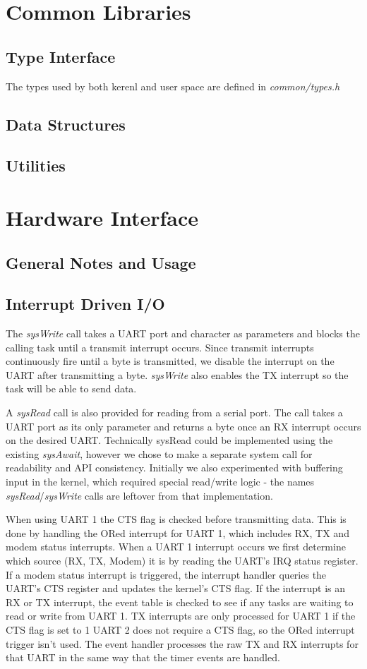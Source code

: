 \documentclass[twoside,a4paper]{refart}
\begin{document}
\section{Common Libraries}
\subsection{Type Interface}
The types used by both kerenl and user space are defined in \textit{common/types.h}
\subsection{Data Structures}
\subsection{Utilities}

\section{Hardware Interface}
\subsection{General Notes and Usage}
\subsection{Interrupt Driven I/O}
The \textit{sysWrite} call takes a UART port and character as parameters and blocks the calling task until a transmit interrupt occurs. Since transmit interrupts continuously fire until a byte is transmitted, we disable the interrupt on the UART after transmitting a byte. \textit{sysWrite} also enables the TX interrupt so the task will be able to send data.

A \textit{sysRead} call is also provided for reading from a serial port. The call takes a UART port as its only parameter and returns a byte once an RX interrupt occurs on the desired UART. Technically sysRead could be implemented using the existing \textit{sysAwait}, however we chose to make a separate system call for readability and API consistency. Initially we also experimented with buffering input in the kernel, which required special read/write logic - the names \textit{sysRead}/\textit{sysWrite} calls are leftover from that implementation. 

When using UART 1 the CTS flag is checked before transmitting data. This is done by handling the ORed interrupt for UART 1, which includes RX, TX and modem status interrupts. When a UART 1 interrupt occurs we first determine which source (RX, TX, Modem) it is by reading the UART’s IRQ status register. If a modem status interrupt is triggered, the interrupt handler queries the UART’s CTS register and updates the kernel’s CTS flag. If the interrupt is an RX or TX interrupt, the event table is checked to see if any tasks are waiting to read or write from UART 1. TX interrupts are only processed for UART 1 if the CTS flag is set to 1 UART 2 does not require a CTS flag, so the ORed interrupt trigger isn’t used. The event handler processes the raw TX and RX interrupts for that UART in the same way that the timer events are handled.
\end{document}
